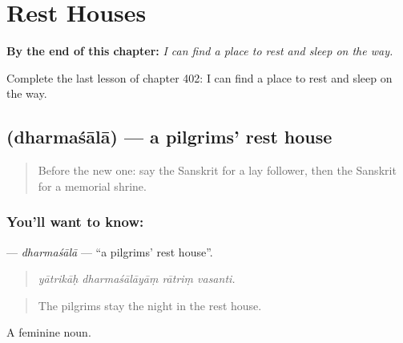 
\chapter{Rest Houses}
\label{ch:sa-rest-houses}

\begin{chapteropening}
\textbf{By the end of this chapter:} \emph{I can find a place to rest and sleep on the way.}

Complete the last lesson of chapter 402: I can find a place to rest and sleep on the way.
\end{chapteropening}

\section[\texorpdfstring{\sk{धर्मशाला} (dharmaśālā)}{धर्मशाला (dharmaśālā)}]{ (dharmaśālā) — a pilgrims' rest house}

\label{lesson:SA-C402-dharmasala}



\begin{quote}
Before the new one: say the Sanskrit for a lay follower, then the Sanskrit for a memorial shrine.
\end{quote}

\subsection*{You'll want to know: }
\textbf{} — \emph{dharmaśālā} — \textquotedblleft{}a pilgrims' rest house\textquotedblright{}.

\begin{quote}
   
\end{quote}

\begin{quote}
\emph{yātrikāḥ dharmaśālāyāṃ rātriṃ vasanti.}
\end{quote}

\begin{quote}
The pilgrims stay the night in the rest house.
\end{quote}

A feminine noun.

